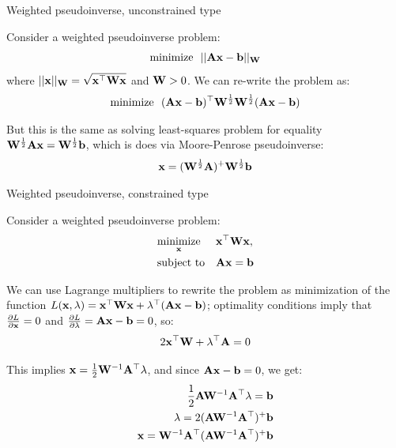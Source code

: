 \documentclass{beamer}
\begin{document}
\begin{frame}{Weighted pseudoinverse, unconstrained type}
	\begin{flushleft}
		
		Consider a weighted pseudoinverse problem:
		\begin{align}
			\text{minimize} \ \ ||\mathbf{A}\mathbf{x}-\mathbf{b}||_{\mathbf{W}}
		\end{align}		
		where $||\mathbf{x}||_{\mathbf{W}} = \sqrt{\mathbf{x}^\top\mathbf{W}\mathbf{x}}$ and $\mathbf{W} > 0$. We can re-write the problem as:
		\begin{align}
			\text{minimize} \ \ (\bo{A}\bo{x}-\bo{b})\T\bo{W}^\frac{1}{2}\bo{W}^\frac{1}{2}(\bo{A}\bo{x}-\bo{b})
		\end{align}
		
		But this is the same as solving least-squares problem for equality $\mathbf{W}^\frac{1}{2}\mathbf{A}\mathbf{x}=\mathbf{W}^\frac{1}{2}\mathbf{b}$, which is does via Moore-Penrose pseudoinverse:
		\begin{align}
			\mathbf{x}=(\mathbf{W}^\frac{1}{2}\mathbf{A})^+\mathbf{W}^\frac{1}{2}\mathbf{b}
		\end{align}
		
	\end{flushleft}
\end{frame}


\begin{frame}{Weighted pseudoinverse, constrained type}
	\begin{flushleft}
		
		Consider a weighted pseudoinverse problem:
		\begin{equation}
			\begin{aligned}
				& \underset{\mathbf{x}}{\text{minimize}}
				& & \mathbf{x}^\top \mathbf{W} \mathbf{x}, \\
				& \text{subject to}
				& & \mathbf{A}\mathbf{x}=\mathbf{b}
			\end{aligned}
		\end{equation}
		
		We can use Lagrange multipliers to rewrite the problem as minimization of the function $L(\mathbf{x}, \lambda) = \mathbf{x}^\top \mathbf{W} \mathbf{x} + \lambda^\top ( \mathbf{A}\mathbf{x}-\mathbf{b})$; optimality conditions imply that $\frac{\partial L}{\partial  \mathbf{x}} = 0$ and $\frac{\partial  L}{\partial  \lambda} = \mathbf{A}\mathbf{x}-\mathbf{b} = 0$, so:
		\begin{align}
			2\mathbf{x}^\top \mathbf{W} + \lambda^\top \mathbf{A} = 0
		\end{align}		
		
		This implies $\mathbf{x} = \frac{1}{2} \mathbf{W}^{-1} \mathbf{A}^\top \lambda$, and since $\mathbf{A}\mathbf{x}-\mathbf{b} = 0$, we get:
		\begin{align}
			\frac{1}{2}\mathbf{A}\mathbf{W}^{-1} \mathbf{A}^\top \lambda= \mathbf{b} \\
			\lambda = 2 (\mathbf{A}\mathbf{W}^{-1} \mathbf{A}^\top)^+ \mathbf{b} \\
			\mathbf{x} = \mathbf{W}^{-1} \mathbf{A}^\top (\mathbf{A}\mathbf{W}^{-1} \mathbf{A}^\top)^+ \mathbf{b}
		\end{align}		
		
		
	\end{flushleft}
\end{frame}
\end{document}
